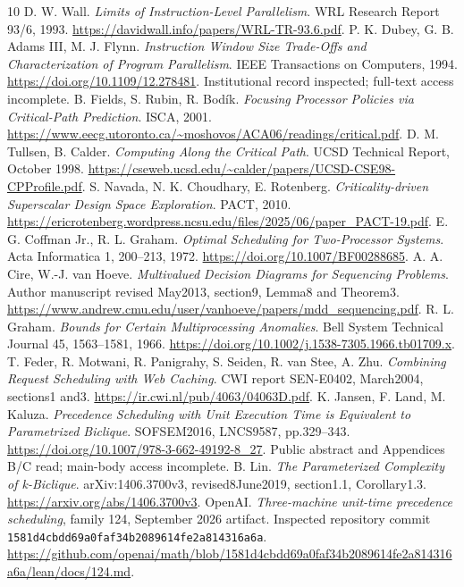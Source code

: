 \documentclass[11pt]{article}
\begin{document}
\begin{thebibliography}{10}
\small
{} D. W. Wall. \emph{Limits of Instruction-Level Parallelism}.
WRL Research Report 93/6, 1993.
\url{https://davidwall.info/papers/WRL-TR-93.6.pdf}.
 P. K. Dubey, G. B. Adams III, M. J. Flynn.
\emph{Instruction Window Size Trade-Offs and Characterization of Program
Parallelism}. IEEE Transactions on Computers, 1994.
\url{https://doi.org/10.1109/12.278481}.
Institutional record inspected; full-text access incomplete.
 B. Fields, S. Rubin, R. Bod\'ik.
\emph{Focusing Processor Policies via Critical-Path Prediction}. ISCA, 2001.
\url{https://www.eecg.utoronto.ca/~moshovos/ACA06/readings/critical.pdf}.
 D. M. Tullsen, B. Calder.
\emph{Computing Along the Critical Path}. UCSD Technical Report, October 1998.
\url{https://cseweb.ucsd.edu/~calder/papers/UCSD-CSE98-CPProfile.pdf}.
 S. Navada, N. K. Choudhary, E. Rotenberg.
\emph{Criticality-driven Superscalar Design Space Exploration}. PACT, 2010.
\url{https://ericrotenberg.wordpress.ncsu.edu/files/2025/06/paper_PACT-19.pdf}.
 E. G. Coffman Jr., R. L. Graham.
\emph{Optimal Scheduling for Two-Processor Systems}. Acta Informatica 1,
200--213, 1972. \url{https://doi.org/10.1007/BF00288685}.
 A. A. Cire, W.-J. van Hoeve.
\emph{Multivalued Decision Diagrams for Sequencing Problems}.
Author manuscript revised May2013, section9, Lemma8 and Theorem3.
\url{https://www.andrew.cmu.edu/user/vanhoeve/papers/mdd_sequencing.pdf}.
 R. L. Graham. \emph{Bounds for Certain Multiprocessing
Anomalies}. Bell System Technical Journal 45, 1563--1581, 1966.
\url{https://doi.org/10.1002/j.1538-7305.1966.tb01709.x}.
 T. Feder, R. Motwani, R. Panigrahy, S. Seiden,
R. van Stee, A. Zhu. \emph{Combining Request Scheduling with Web Caching}.
CWI report SEN-E0402, March2004, sections1 and3.
\url{https://ir.cwi.nl/pub/4063/04063D.pdf}.
 K. Jansen, F. Land, M. Kaluza.
\emph{Precedence Scheduling with Unit Execution Time is Equivalent to
Parametrized Biclique}. SOFSEM2016, LNCS9587, pp.329--343.
\url{https://doi.org/10.1007/978-3-662-49192-8_27}.
Public abstract and Appendices B/C read; main-body access incomplete.
 B. Lin. \emph{The Parameterized Complexity of k-Biclique}.
arXiv:1406.3700v3, revised8June2019, section1.1, Corollary1.3.
\url{https://arxiv.org/abs/1406.3700v3}.
 OpenAI. \emph{Three-machine unit-time precedence scheduling},
family 124, September 2026 artifact. Inspected repository commit
\texttt{1581d4cbdd69a0faf34b2089614fe2a814316a6a}.
\url{https://github.com/openai/math/blob/1581d4cbdd69a0faf34b2089614fe2a814316a6a/lean/docs/124.md}.
\end{thebibliography}
\end{document}

